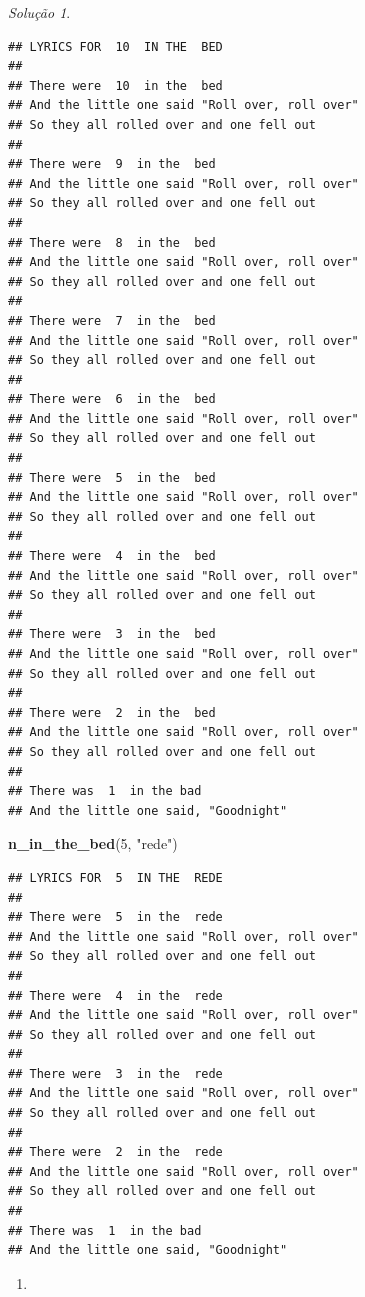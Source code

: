 \documentclass[
]{latex/krantz}
\newenvironment{Shaded}{\begin{snugshade}}{\end{snugshade}}
\newcommand{\DecValTok}[1]{\textcolor[rgb]{0.00,0.00,0.81}{#1}}
\newcommand{\FunctionTok}[1]{\textcolor[rgb]{0.13,0.29,0.53}{\textbf{#1}}}
\newcommand{\NormalTok}[1]{#1}
\newcommand{\StringTok}[1]{\textcolor[rgb]{0.31,0.60,0.02}{#1}}
\providecommand{\tightlist}{%
  \setlength{\itemsep}{0pt}\setlength{\parskip}{0pt}}
\theoremstyle{definition}
\theoremstyle{definition}
\theoremstyle{definition}
\theoremstyle{definition}
\theoremstyle{remark}
\newtheorem*{solution}{Solução}
\begin{document}
\begin{solution}
\begin{verbatim}
## LYRICS FOR  10  IN THE  BED 
## 
## There were  10  in the  bed 
## And the little one said "Roll over, roll over"
## So they all rolled over and one fell out 
## 
## There were  9  in the  bed 
## And the little one said "Roll over, roll over"
## So they all rolled over and one fell out 
## 
## There were  8  in the  bed 
## And the little one said "Roll over, roll over"
## So they all rolled over and one fell out 
## 
## There were  7  in the  bed 
## And the little one said "Roll over, roll over"
## So they all rolled over and one fell out 
## 
## There were  6  in the  bed 
## And the little one said "Roll over, roll over"
## So they all rolled over and one fell out 
## 
## There were  5  in the  bed 
## And the little one said "Roll over, roll over"
## So they all rolled over and one fell out 
## 
## There were  4  in the  bed 
## And the little one said "Roll over, roll over"
## So they all rolled over and one fell out 
## 
## There were  3  in the  bed 
## And the little one said "Roll over, roll over"
## So they all rolled over and one fell out 
## 
## There were  2  in the  bed 
## And the little one said "Roll over, roll over"
## So they all rolled over and one fell out 
## 
## There was  1  in the bad
## And the little one said, "Goodnight"
\end{verbatim}

\begin{Shaded}
\begin{Highlighting}[]
\FunctionTok{n\_in\_the\_bed}\NormalTok{(}\DecValTok{5}\NormalTok{, }\StringTok{"rede"}\NormalTok{)}
\end{Highlighting}
\end{Shaded}

\begin{verbatim}
## LYRICS FOR  5  IN THE  REDE 
## 
## There were  5  in the  rede 
## And the little one said "Roll over, roll over"
## So they all rolled over and one fell out 
## 
## There were  4  in the  rede 
## And the little one said "Roll over, roll over"
## So they all rolled over and one fell out 
## 
## There were  3  in the  rede 
## And the little one said "Roll over, roll over"
## So they all rolled over and one fell out 
## 
## There were  2  in the  rede 
## And the little one said "Roll over, roll over"
## So they all rolled over and one fell out 
## 
## There was  1  in the bad
## And the little one said, "Goodnight"
\end{verbatim}

\begin{enumerate}
\def\labelenumi{\alph{enumi}.}
\setcounter{enumi}{2}
\tightlist
\item
\end{enumerate}


\end{solution}
\end{document}
